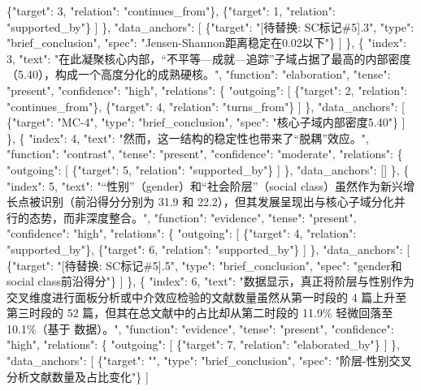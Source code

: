 \documentclass[12pt,a4paper]{article}
\begin{document}
              \{"target": 3, "relation": "continues\_from"\},
              \{"target": 1, "relation": "supported\_by"\}
            ]
          \},
          "data\_anchors": [
            \{"target": "[待替换: SC标记\#5].3", "type": "brief\_conclusion", "spec": "Jensen-Shannon距离稳定在0.02以下"\}
          ]
        \},
        \{
          "index": 3,
          "text": "在此凝聚核心内部，“不平等—成就—追踪”子域占据了最高的内部密度（5.40），构成一个高度分化的成熟硬核。",
          "function": "elaboration",
          "tense": "present",
          "confidence": "high",
          "relations": \{
            "outgoing": [
              \{"target": 2, "relation": "continues\_from"\},
              \{"target": 4, "relation": "turns\_from"\}
            ]
          \},
          "data\_anchors": [
            \{"target": "MC-4", "type": "brief\_conclusion", "spec": "核心子域内部密度5.40"\}
          ]
        \},
        \{
          "index": 4,
          "text": "然而，这一结构的稳定性也带来了“脱耦”效应。",
          "function": "contrast",
          "tense": "present",
          "confidence": "moderate",
          "relations": \{
            "outgoing": [
              \{"target": 5, "relation": "supported\_by"\}
            ]
          \},
          "data\_anchors": []
        \},
        \{
          "index": 5,
          "text": "“性别”（gender）和“社会阶层”（social class）虽然作为新兴增长点被识别（前沿得分分别为 31.9 和 22.2），但其发展呈现出与核心子域分化并行的态势，而非深度整合。",
          "function": "evidence",
          "tense": "present",
          "confidence": "high",
          "relations": \{
            "outgoing": [
              \{"target": 4, "relation": "supported\_by"\},
              \{"target": 6, "relation": "supported\_by"\}
            ]
          \},
          "data\_anchors": [
            \{"target": "[待替换: SC标记\#5].5", "type": "brief\_conclusion", "spec": "gender和social class前沿得分"\}
          ]
        \},
        \{
          "index": 6,
          "text": "数据显示，真正将阶层与性别作为交叉维度进行面板分析或中介效应检验的文献数量虽然从第一时段的 4 篇上升至第三时段的 52 篇，但其在总文献中的占比却从第二时段的 11.9\% 轻微回落至 10.1\%（基于  数据）。",
          "function": "evidence",
          "tense": "present",
          "confidence": "high",
          "relations": \{
            "outgoing": [
              \{"target": 7, "relation": "elaborated\_by"\}
            ]
          \},
          "data\_anchors": [
            \{"target": "", "type": "brief\_conclusion", "spec": "阶层-性别交叉分析文献数量及占比变化"\}
          ]
\end{document}
